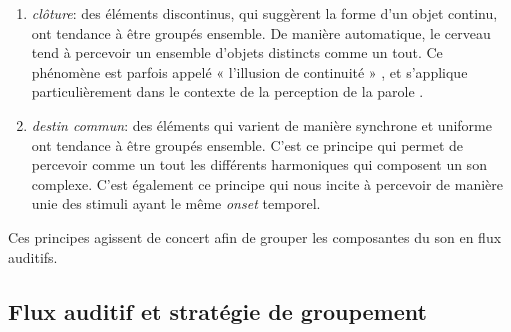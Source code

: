 \begin{enumerate}
\item \emph{clôture}: des éléments discontinus, qui suggèrent la forme d'un objet continu, ont tendance à être groupés ensemble. De manière automatique, le cerveau tend à percevoir un ensemble d'objets distincts comme un tout.  Ce phénomène est parfois appelé « l’illusion de continuité » \citep{dannenbring1976perceived}, et s'applique particulièrement dans le contexte de la perception de la parole \citep{carlyon2002continuity}.
\item \emph{destin commun}: des éléments qui varient de manière synchrone et uniforme ont tendance à être groupés ensemble. C'est ce principe qui permet de percevoir comme un tout les différents harmoniques qui composent un son complexe. C'est également ce principe qui nous incite à percevoir de manière unie des stimuli ayant le même \emph{onset} temporel.
\end{enumerate}

Ces principes agissent de concert afin de grouper les composantes du son en flux auditifs.

\subsection{Flux auditif et stratégie de groupement}
\label{sec:ch3_asaFlux}

